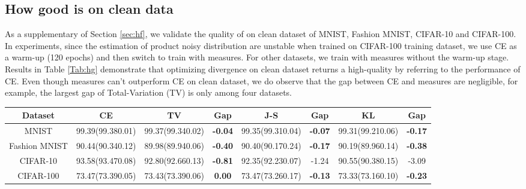 \documentclass{article}
\begin{document}
\subsection{How good is  on clean data}
As a supplementary of Section \ref{sec:hf}, we validate the quality of  on clean dataset of MNIST, Fashion MNIST, CIFAR-10 and CIFAR-100. In experiments, since the estimation of product noisy distribution are unstable when trained on CIFAR-100 training dataset, we use CE as a warm-up (120 epochs) and then switch to train with  measures. For other datasets, we train with  measures without the warm-up stage. Results in Table \ref{Tab:hg} demonstrate that optimizing divergence on clean dataset returns a high-quality  by referring to the performance of CE. Even though  measures can't outperform CE on clean dataset, we do observe that the gap between CE and  measures are negligible, for example, the largest gap of Total-Variation (TV) is only  among four datasets.  


\begin{table*}[!ht]
\scriptsize
\centering
\begin{threeparttable}
\begin{tabular}{c|c|c|c|c|c|c|c}
\hline
Dataset &  CE &  \textbf{TV} & Gap & \textbf{J-S} & Gap & \textbf{KL} & Gap \\ \hline\hline
\multirow{1}{*}{MNIST}
& 99.39(99.380.01) & 99.37(99.340.02) &{\color{blue}\textbf{-0.04}}  & 99.35(99.310.04) & {\color{blue}\textbf{-0.07}} & 99.31(99.210.06) & {\color{blue}\textbf{-0.17}}
\\ 
\hline
\multirow{1}{*}{Fashion MNIST}
& 90.44(90.340.12) & 89.98(89.940.06) & {\color{blue}\textbf{-0.40 }}& 90.40(90.170.24)  & {\color{blue}\textbf{-0.17}} & 90.19(89.960.14) & {\color{blue}\textbf{-0.38}}
\\ 
\hline
\multirow{1}{*}{CIFAR-10}
& 93.58(93.470.08) & 92.80(92.660.13) &{\color{blue}\textbf{-0.81}} & 92.35(92.230.07) & -1.24 & 90.55(90.380.15) & -3.09
\\ 
\hline
\multirow{1}{*}{CIFAR-100}
& 73.47(73.390.05) & 73.43(73.390.06) & {\color{blue}\textbf{0.00}} & 73.47(73.260.17)& {\color{blue}\textbf{-0.13}} & 73.33(73.160.10) & {\color{blue}\textbf{-0.23}}
\\ 
\hline
\end{tabular}
\end{threeparttable}
\caption{Experiment results comparison on clean datasets: We report the maximum accuracy of CE and each  measures along with (mean  standard deviation); Gap: mean performance comparison w.r.t. CE. Numbers highlighted in \color{blue}\textbf{{blue}} \color{black} indicate the gap is less than 1\%.
}
\label{Tab:hg}
\end{table*}
\end{document}
